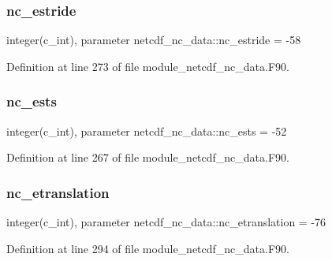 \mbox{\label{namespacenetcdf__nc__data_a687c32103bfa8244d01676f38387111c}} 
\subsubsection{\texorpdfstring{nc\+\_\+estride}{nc\_estride}}
{\footnotesize\ttfamily integer(c\+\_\+int), parameter netcdf\+\_\+nc\+\_\+data\+::nc\+\_\+estride = -\/58}



Definition at line 273 of file module\+\_\+netcdf\+\_\+nc\+\_\+data.\+F90.

\mbox{\label{namespacenetcdf__nc__data_a1d5fe03e609c4e9a402517518099f92e}} 
\subsubsection{\texorpdfstring{nc\+\_\+ests}{nc\_ests}}
{\footnotesize\ttfamily integer(c\+\_\+int), parameter netcdf\+\_\+nc\+\_\+data\+::nc\+\_\+ests = -\/52}



Definition at line 267 of file module\+\_\+netcdf\+\_\+nc\+\_\+data.\+F90.

\mbox{\label{namespacenetcdf__nc__data_a9dbf3b245bc3502ef973dd551acd3183}} 
\subsubsection{\texorpdfstring{nc\+\_\+etranslation}{nc\_etranslation}}
{\footnotesize\ttfamily integer(c\+\_\+int), parameter netcdf\+\_\+nc\+\_\+data\+::nc\+\_\+etranslation = -\/76}



Definition at line 294 of file module\+\_\+netcdf\+\_\+nc\+\_\+data.\+F90.

